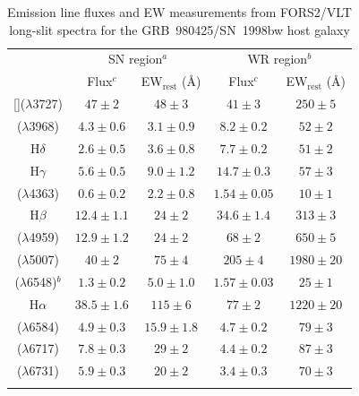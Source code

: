 \documentclass[traditabstract]{aa}
\newcommand{\sii}{[\ion{S}{ii}]}
\newcommand{\oii}{[\ion{O}{ii}]}
\newcommand{\oiii}{[\ion{O}{iii}]}
\newcommand{\neiii}{[\ion{Ne}{iii}]}
\newcommand{\nii}{[\ion{N}{ii}]}
\begin{document}
\begin{appendix}
\begin{table}[!ht]
\caption{Emission line fluxes and EW measurements from FORS2/VLT long-slit spectra for the GRB~980425/SN~1998bw host galaxy \label{tab:fluxes}}
\centering
\begin{tabular}{ccccc}
\hline
\hline\noalign{\smallskip}
 &  \multicolumn{2}{c}{SN region$^{a}$} &  \multicolumn{2}{c}{WR region$^{b}$}  \\
 &  Flux$^{c}$ & EW$_{\mathrm{rest}}$ (\AA)  & Flux$^{c}$ & EW$_{\mathrm{rest}}$ (\AA) \\

\hline\noalign{\smallskip}

\oii($\lambda$3727)  & $47\pm2$ & $48\pm3$ & $41\pm3$ & $250\pm5$ \\
\neiii($\lambda$3968)& $4.3\pm0.6$ & $3.1\pm0.9$ & $8.2\pm0.2$ & $52\pm2$ \\
H$\delta$            & $2.6\pm0.5$ & $3.6\pm0.8$ & $7.7\pm0.2$ & $51\pm2$ \\
H$\gamma$            & $5.6\pm0.5$ & $9.0\pm1.2$ & $14.7\pm0.3$ & $57\pm3$ \\
\oiii($\lambda$4363) & $0.6\pm0.2$ & $2.2\pm0.8$ & $1.54\pm0.05$ & $10\pm1$ \\
H$\beta$             & $12.4\pm1.1$ & $24\pm2$ & $34.6\pm1.4$ & $313\pm3$ \\
\oiii($\lambda$4959) & $12.9\pm1.2$ & $24\pm2$ & $68\pm2$ & $650\pm5$ \\
\oiii($\lambda$5007) & $40\pm2$ & $75\pm4$ & $205\pm4$ & $1980\pm20$ \\
\hline
\hline
\nii($\lambda$6548)$^{b}$  & $1.3\pm0.2$ & $5.0\pm1.0$ & $1.57\pm0.03$ & $25\pm1$ \\
H$\alpha$            & $38.5\pm1.6$ & $115\pm6$ & $77\pm2$ & $1220\pm20$ \\
\nii($\lambda$6584)  & $4.9 \pm 0.3$ & $15.9\pm1.8$ & $4.7\pm0.2$ & $79\pm3$ \\
\sii($\lambda$6717)  & $7.8 \pm 0.3$ & $29\pm2$ & $4.4\pm0.2$ & $87\pm3$ \\
\sii($\lambda$6731)  & $5.9 \pm 0.3$ & $20\pm2$ & $3.4\pm0.3$ & $70\pm3$ \\
\hline\noalign{\smallskip}
\end{tabular}

\end{table}


\end{appendix}
\end{document}
